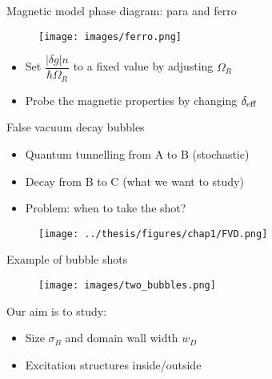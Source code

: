 \documentclass[aspectratio=169]{beamer}
\begin{document}
\begin{frame}{Magnetic model phase diagram: para and ferro}
  \begin{minipage}{0.7\textwidth}
    \begin{figure}
      \centering
      \texttt{[image: images/ferro.png]}
    \end{figure} 
  \end{minipage}
  \hspace{0.01\textwidth}
  \begin{minipage}{0.27\textwidth}
    \begin{itemize}
      \item Set $\dfrac{|\delta g| n}{\hbar\Omega_R}$ to a fixed value by adjusting $\Omega_R$
      \item Probe the magnetic properties by changing $\delta_{\rm eff}$
    \end{itemize}
  \end{minipage}
\end{frame} 

\begin{frame}{False vacuum decay bubbles}
  \begin{minipage}{0.32\textwidth}
    \begin{itemize}
      \item Quantum tunnelling from A to B (stochastic)
      \item Decay from B to C (what we want to study)
      \item Problem: when to take the shot?
    \end{itemize}
  \end{minipage}
  \hspace{0.01\textwidth}
  \begin{minipage}{0.65\textwidth}
    \begin{figure}
      \centering
      \texttt{[image: ../thesis/figures/chap1/FVD.png]}
    \end{figure} 
  \end{minipage}
\end{frame}

\begin{frame}{Example of bubble shots}
  \begin{figure}
    \centering
    \texttt{[image: images/two\_bubbles.png]}
  \end{figure}
  Our aim is to study:
  \begin{itemize}
    \item Size $\sigma_B$ and domain wall width $w_D$
    \item Excitation structures inside/outside
  \end{itemize}
\end{frame}
\end{document}
